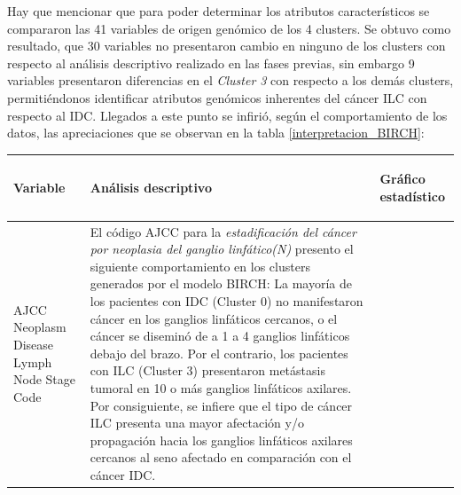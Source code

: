 Hay que mencionar que para poder determinar los atributos característicos se compararon las 41 variables de origen genómico de los 4 clusters. Se obtuvo como resultado, que 30 variables no presentaron cambio en ninguno de los clusters con respecto al análisis descriptivo realizado en las fases previas, sin embargo 9 variables presentaron diferencias en el \textit{Cluster 3} con respecto a los demás clusters, permitiéndonos identificar atributos genómicos inherentes del cáncer ILC con respecto al IDC. Llegados a este punto se infirió, según el comportamiento de los datos, las apreciaciones que se observan en la tabla \ref{interpretacion_BIRCH}:
\begin{table}[htb!]
	\footnotesize
	\begin{threeparttable}
		\begin{tabular}{p{2.5cm} p{7cm} p{6.5cm}} \toprule
			\begin{center}Variable\end{center}   	 
			&\begin{center}Análisis descriptivo\end{center}             
			&\begin{center}Gráfico estadístico\end{center}\\ \hline
			AJCC Neoplasm Disease Lymph Node Stage Code
			&  El código AJCC para la \textit{estadificación del cáncer por neoplasia del ganglio linfático(N)} presento el siguiente comportamiento en los clusters generados por el modelo BIRCH: La mayoría de los pacientes con IDC (Cluster 0) no manifestaron cáncer en los ganglios linfáticos cercanos, o el cáncer se diseminó de a 1 a 4 ganglios linfáticos debajo del brazo. Por el contrario, los pacientes con ILC (Cluster 3) presentaron metástasis tumoral en 10 o más ganglios linfáticos axilares. Por consiguiente, se infiere que el tipo de cáncer ILC presenta una mayor afectación y/o propagación hacia los ganglios linfáticos axilares cercanos al seno afectado en comparación con el cáncer IDC.
			

\end{tabular}
\end{threeparttable}
\end{table}
